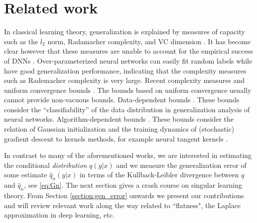 \documentclass{article} %
\begin{document}
\section{Related work}
In classical learning theory, generalization is explained by measures of capacity such as the $l_2$ norm, Radamacher complexity, and VC dimension \citep{bousquet2003introduction}. It has become clear however that these measures are unable to account for the empirical success of DNNs \citep{zhang_understanding_2017}. 
Over-parameterized neural networks can easily fit random labels \cite{zhang2016understanding,du2018gradient,allen2019convergence} while have good generalization performance, indicating that the complexity measures such as Rademacher complexity is very large.
Recent complexity measures and uniform convergence bounds \cite{neyshabur2015norm,bartlett2017spectrally,neyshabur2018towards,neyshabur2019towards,arora2018stronger}. The bounds based on uniform convergence usually cannot provide non-vacuous bounds.
Data-dependent bounds \cite{brutzkus2017sgd,li2018learning,allen2019learning}. These bounds consider the ``classifiability'' of the data distribution in generalization analysis of neural networks.
Algorithm-dependent bounds \cite{daniely2017sgd,arora2019fine,yehudai2019power,cao2019generalization}. These bounds consider the relation of Gaussian initialization and the training dynamics of (stochastic) gradient descent to kernels methods, for example neural tangent kernels \cite{jacot2018neural}.

In contrast to many of the aforementioned works, we are interested in estimating the conditional \textit{distribution} $q(y|x)$ and we measure the generalization error of some estimate $\hat q_n(y|x)$ in terms of the Kullback-Leibler divergence between $q$ and $\hat q_n$, see \eqref{eq:Gn}. The next section gives a crash course on singular learning theory. From Section \ref{section:gen_error} onwards we present our contributions and will review relevant work along the way related to ``flatness", the Laplace approximation in deep learning, etc. 
\end{document}
